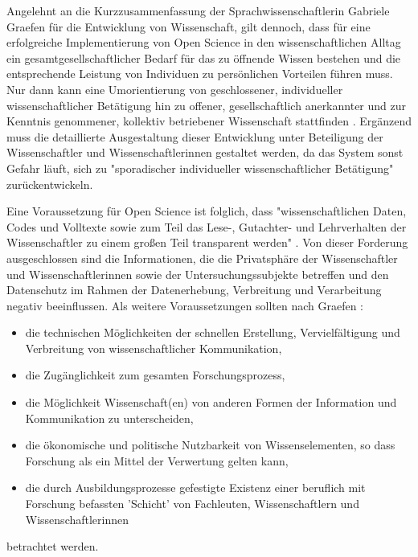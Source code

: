 Angelehnt an die Kurzzusammenfassung der Sprachwissenschaftlerin Gabriele Graefen für die Entwicklung von Wissenschaft, gilt dennoch, dass für eine erfolgreiche Implementierung von Open Science in den wissenschaftlichen Alltag ein gesamtgesellschaftlicher Bedarf für das zu öffnende Wissen bestehen und die entsprechende Leistung von Individuen zu persönlichen Vorteilen führen muss. Nur dann kann eine Umorientierung von geschlossener, individueller wissenschaftlicher Betätigung hin zu offener, gesellschaftlich anerkannter und zur Kenntnis genommener, kollektiv betriebener Wissenschaft stattfinden \cite{Graefen_2007}. Ergänzend muss die detaillierte Ausgestaltung dieser Entwicklung unter Beteiligung der Wissenschaftler und Wissenschaftlerinnen gestaltet werden, da das System sonst Gefahr läuft, sich zu "sporadischer individueller wissenschaftlicher Betätigung" \cite{Graefen_2007} zu­rück­ent­wi­ckeln.

Eine Voraussetzung für Open Science ist folglich, dass "wissenschaftlichen Daten, Codes und Volltexte sowie zum Teil das Lese-, Gutachter- und Lehrverhalten der Wissenschaftler zu einem großen Teil transparent werden" \cite{Brembs_2015}. Von dieser Forderung ausgeschlossen sind die Informationen, die die Privatsphäre der Wissenschaftler und Wissenschaftlerinnen sowie der Untersuchungssubjekte betreffen und den Datenschutz im Rahmen der Datenerhebung, Verbreitung und Verarbeitung negativ beeinflussen. Als weitere Voraussetzungen sollten nach Graefen \cite{Graefen_2007}:
\begin{itemize}
\item die technischen Möglichkeiten der schnellen Erstellung, Vervielfältigung und Verbreitung von wissenschaftlicher Kommunikation,
\item die Zugänglichkeit zum gesamten Forschungsprozess,
\item die Möglichkeit Wissenschaft(en) von anderen Formen der Information und Kommunikation zu unterscheiden,
\item die ökonomische und politische Nutzbarkeit von Wissenselementen, so dass Forschung als ein Mittel der Verwertung gelten kann,
\item die durch Ausbildungsprozesse gefestigte Existenz einer beruflich mit Forschung befassten 'Schicht' von Fachleuten, Wissenschaftlern und Wissenschaftlerinnen
\end{itemize}
betrachtet werden.

